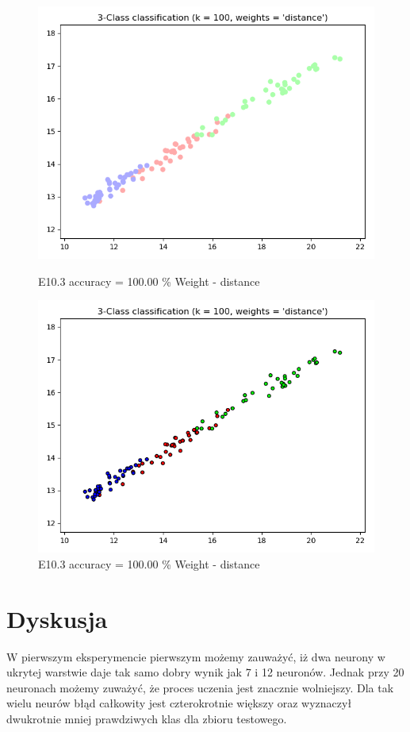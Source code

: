 \documentclass{classrep}
\begin{document}
\begin{figure}[H]
\begin{minipage}{0.5\linewidth}
				\includegraphics[scale=0.25]{KNN_seed_10_11.png}
				\caption{E10.3 accuracy = 100.00 \% Weight - distance}
				\label{E10.3}
			\end{minipage}
			\begin{minipage}{0.5\linewidth}
				\centering
				\includegraphics[scale=0.25]{KNN_seed_10_12.png}
				\caption{E10.3 accuracy = 100.00 \% Weight - distance}
				\label{E10.3}
			\end{minipage}
		\end{figure}
		\FloatBarrier
			

\section{Dyskusja}
W pierwszym eksperymencie pierwszym możemy zauważyć, iż dwa neurony w ukrytej warstwie daje tak samo dobry wynik jak 7 i 12 neuronów. Jednak przy 20 neuronach możemy zuważyć, że proces uczenia jest znacznie wolniejszy. Dla tak wielu neurów błąd całkowity jest czterokrotnie większy oraz wyznaczył dwukrotnie mniej prawdziwych klas dla zbioru testowego.
\end{document}
